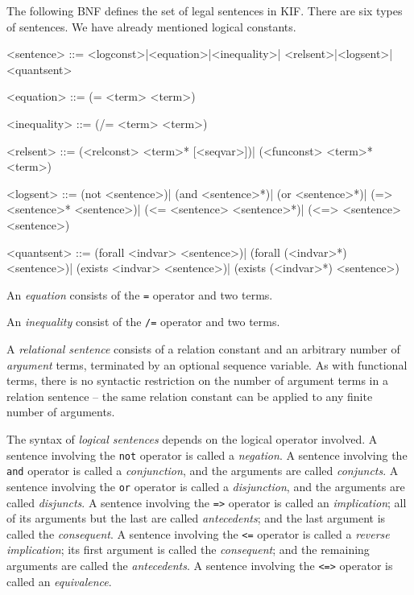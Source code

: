 The following BNF defines the set of legal sentences in KIF.  There
are six types of sentences.  We have already mentioned logical constants.

\medskip
\beginverbatim
<sentence> ::= <logconst>|<equation>|<inequality>|
               <relsent>|<logsent>|<quantsent>

<equation> ::= (= <term> <term>)

<inequality> ::= (/= <term> <term>)

<relsent> ::= (<relconst> <term>* [<seqvar>])|
              (<funconst> <term>* <term>)

<logsent> ::= (not <sentence>)|
              (and <sentence>*)|
              (or <sentence>*)|
              (=> <sentence>* <sentence>)|
              (<= <sentence> <sentence>*)|
              (<=> <sentence> <sentence>)

<quantsent> ::= (forall <indvar> <sentence>)|
                (forall (<indvar>*) <sentence>)|
                (exists <indvar> <sentence>)|
                (exists (<indvar>*) <sentence>)
\endverbatim
\medskip

An {\it equation} consists of the {\tt =} operator and two terms.

An {\it inequality} consist of the {\tt /=} operator and two terms.

A {\it relational sentence} consists of a relation constant and an arbitrary
number of {\it argument} terms, terminated by an optional sequence variable. 
As with functional terms, there is no syntactic  restriction on the number of
argument terms in a relation sentence -- the same relation constant can be
applied to any finite number of arguments.

The syntax of {\it logical sentences} depends on the logical operator
involved.  A sentence involving the {\tt not} operator is called a {\it
negation}.  A sentence involving the {\tt and} operator is called a {\it
conjunction}, and the arguments are called {\it conjuncts}.  A sentence
involving the {\tt or} operator is called a {\it disjunction}, and the
arguments are called {\it disjuncts}.  A sentence involving the {\tt =>}
operator is called an {\it implication}; all of its arguments but the last are
called {\it antecedents}; and the last argument is called the {\it
consequent}.  A sentence involving the {\tt <=} operator is called a {\it
reverse implication}; its first argument is called the {\it consequent}; and
the remaining arguments are called the {\it antecedents}.  A sentence involving
the {\tt <=>} operator is called an {\it equivalence}.

